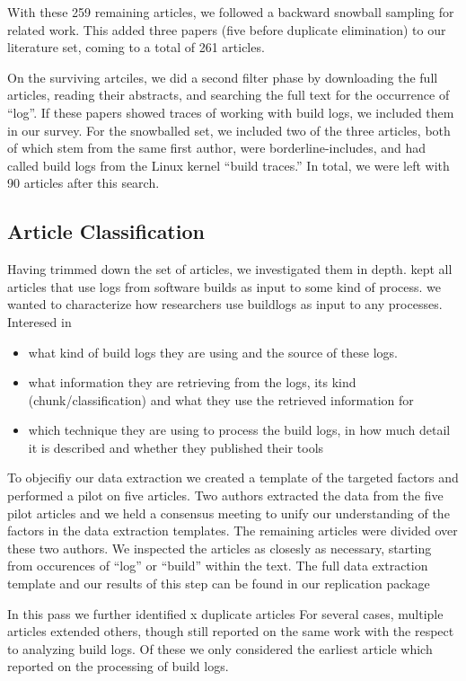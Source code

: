 With these 259 remaining articles, we followed a backward snowball
sampling for related work.
This added three papers (five before
duplicate elimination) to our literature set, coming to a total of 261
articles.

On the surviving artciles, we did a second filter phase by downloading the
full articles, reading their abstracts, and searching the full text
for the occurrence of ``log''.
If these papers showed traces of
working with build logs, we included them in our survey.
For the
snowballed set, we included two of the three articles, both of which
stem from the same first author, were borderline-includes, and had
called build logs from the Linux kernel ``build traces.'' In total, we
were left with 90 articles after this search.

\subsection{Article Classification}
Having trimmed down the set of articles, we investigated them in depth.
kept all articles that use logs from software builds as input to some
kind of process.
we wanted to characterize how researchers use buildlogs as input to
any processes.
Interesed in
\begin{itemize}
  \item what kind of build logs they are using and the source of these
  logs.
  \item what information they are retrieving from the logs,
  its kind (chunk/classification) and
  what they use the retrieved information for
  \item which technique they are using to process the build logs,
  in how much detail it is described and whether they published their
  tools
\end{itemize}
To objecifiy our data extraction we created a template of the targeted
factors
and performed a pilot on five articles.
Two authors extracted the data from the
five pilot articles and we held a consensus meeting to unify our
understanding
of the factors in the data extraction templates.
The remaining articles were
divided over these two authors.
We inspected the articles as closesly as necessary,
starting from occurences of ``log'' or ``build'' within the text.
The full data extraction template and our results of this step can be
found in
our replication package %

In this pass we further identified x duplicate articles %
For several cases, multiple articles extended others, though still
reported on
the same work with the respect to analyzing build logs.
Of these we only considered the earliest article which reported on
the processing
of build logs.

